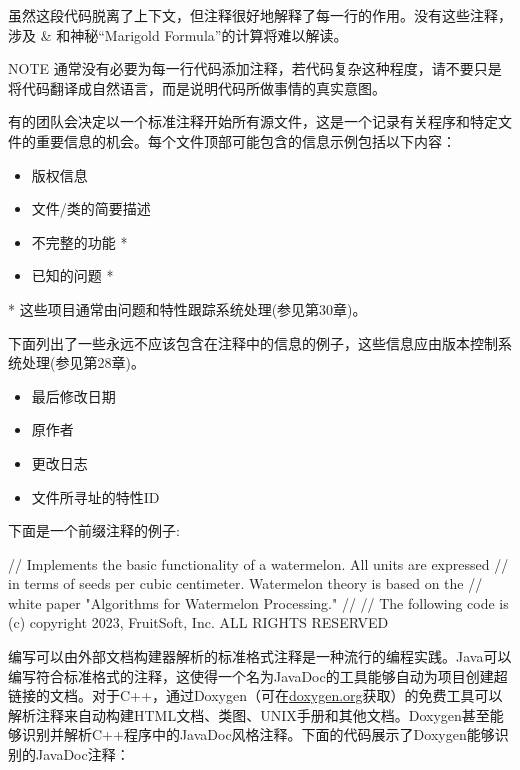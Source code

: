 虽然这段代码脱离了上下文，但注释很好地解释了每一行的作用。没有这些注释，涉及 \& 和神秘“Marigold Formula”的计算将难以解读。

\begin{myNotic}{NOTE}
通常没有必要为每一行代码添加注释，若代码复杂这种程度，请不要只是将代码翻译成自然语言，而是说明代码所做事情的真实意图。
\end{myNotic}


有的团队会决定以一个标准注释开始所有源文件，这是一个记录有关程序和特定文件的重要信息的机会。每个文件顶部可能包含的信息示例包括以下内容：

\begin{itemize}
\item
版权信息

\item
文件/类的简要描述

\item
不完整的功能 *

\item
已知的问题 *
\end{itemize}

* 这些项目通常由问题和特性跟踪系统处理(参见第30章)。

下面列出了一些永远不应该包含在注释中的信息的例子，这些信息应由版本控制系统处理(参见第28章)。

\begin{itemize}
\item
最后修改日期

\item
原作者

\item
更改日志

\item
文件所寻址的特性ID
\end{itemize}

下面是一个前缀注释的例子:

\begin{cpp}
// Implements the basic functionality of a watermelon. All units are expressed
// in terms of seeds per cubic centimeter. Watermelon theory is based on the
// white paper "Algorithms for Watermelon Processing."
//
// The following code is (c) copyright 2023, FruitSoft, Inc. ALL RIGHTS RESERVED
\end{cpp}


编写可以由外部文档构建器解析的标准格式注释是一种流行的编程实践。Java可以编写符合标准格式的注释，这使得一个名为JavaDoc的工具能够自动为项目创建超链接的文档。对于C++，通过Doxygen（可在\url{doxygen.org}获取）的免费工具可以解析注释来自动构建HTML文档、类图、UNIX手册和其他文档。Doxygen甚至能够识别并解析C++程序中的JavaDoc风格注释。下面的代码展示了Doxygen能够识别的JavaDoc注释：

